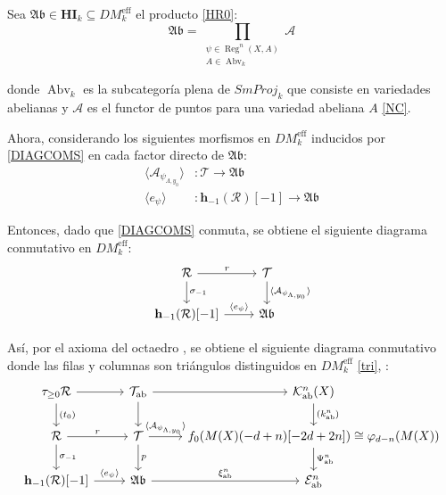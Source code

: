 \documentclass[10pt]{amsart}
\theoremstyle{definition}
\theoremstyle{remark}
\theoremstyle{definition}
\begin{document}
Sea $\mathfrak{Ab} \in \mathbf{HI}_{k} \subseteq DM^{\mathrm{eff}}_{k}$ el producto \ref{HR0}:
\begin{equation}\label{4.1.2}
\mathfrak{Ab} = \prod_{\substack{\psi \in \operatorname{Reg}^{n}(X,A) \\ A \in \operatorname{Abv}_{k}}} \mathcal{A}
\end{equation}


donde $\operatorname{Abv}_{k}$ es la subcategoría plena de $SmProj_{k}$ que consiste en variedades abelianas y $\mathcal{A}$ es el functor de puntos para una variedad abeliana $A$ \ref{NC}.

Ahora, considerando los siguientes morfismos en $DM^{\mathrm{eff}}_{k}$ inducidos por \ref{DIAGCOMS} en cada factor directo de $\mathfrak{Ab}$:
\begin{align}\label{CUAC}
\langle \mathcal{A}_{\psi_{\Lambda,y_{0}}} \rangle &: \mathcal{T} \to \mathfrak{Ab} \\
\langle e_{\psi} \rangle &: \mathbf{h}_{-1}(\mathcal{R})[-1] \to \mathfrak{Ab}
\end{align}

Entonces, dado que \ref{DIAGCOMS} conmuta, se obtiene el siguiente diagrama conmutativo en $DM^{\mathrm{eff}}_{k}$:
\begingroup{}\label{D10}
\[
\begin{tikzcd}
\mathcal{R} \arrow[r, "r"] \arrow[d, "\sigma_{-1}"] & \mathcal{T} \arrow[d, "\langle \mathcal{A}_{\psi_{\Lambda,y_{0}}} \rangle"] \\
\mathbf{h}_{-1}(\mathcal{R})[-1] \arrow[r, "\langle e_{\psi} \rangle"] & \mathfrak{Ab}
\end{tikzcd}
\]
\endgroup



Así, por el axioma del octaedro \cite[Prop. 1.1.11]{BBD82}, se obtiene el siguiente diagrama conmutativo donde las filas y columnas son triángulos distinguidos en $DM^{\mathrm{eff}}_{k}$ \ref{tri}, \label{diag.principal}:
\begin{equation}\label{DCG}
\begin{tikzcd}
\tau_{\geq 0}\mathcal{R} \arrow[r] \arrow[d, "(t_{0})"] & \mathcal{T}_{\mathrm{ab}} \arrow[r] \arrow[d] & \mathcal{K}^{n}_{\mathrm{ab}}(X) \arrow[d, "(k^{n}_{\mathrm{ab}})"] \\
\mathcal{R} \arrow[r, "r"] \arrow[d, "\sigma_{-1}"] & \mathcal{T} \arrow[r, "\langle \mathcal{A}_{\psi_{\Lambda,y_{0}}} \rangle"] \arrow[d, "p"] & f_{0}(M(X)(-d+n)[-2d+2n]) \cong \varphi_{d-n}(M(X)) \arrow[d, "\Psi^{n}_{\mathrm{ab}}"] \\
\mathbf{h}_{-1}(\mathcal{R})[-1] \arrow[r, "\langle e_{\psi} \rangle"] & \mathfrak{Ab} \arrow[r, "\xi^{n}_{\mathrm{ab}}"] & \mathcal{E}^{n}_{\mathrm{ab}}
\end{tikzcd}
\end{equation}
\end{document}
